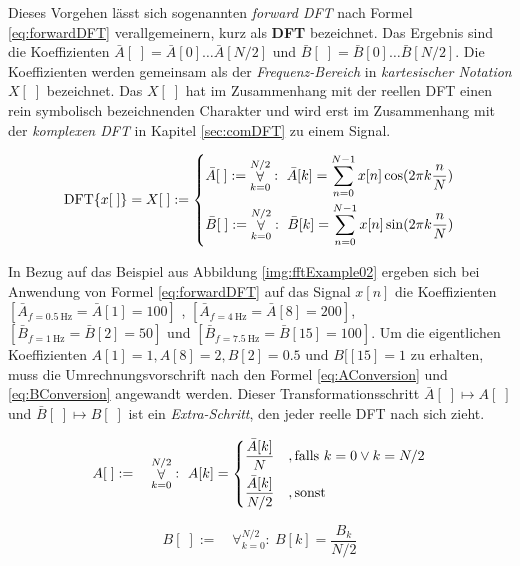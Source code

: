 Dieses Vorgehen lässt sich sogenannten \emph{forward DFT} nach Formel \ref{eq:forwardDFT} verallgemeinern, kurz als \textbf{DFT} bezeichnet. Das Ergebnis sind die Koeffizienten $\bar{A}[\;] = \bar{A}[0]\ldots \bar{A}[N/2]$ und $\bar{B}[\;] = \bar{B}[0] \ldots \bar{B}[N/2]$. Die Koeffizienten werden gemeinsam als der \emph{Frequenz-Bereich} in \emph{kartesischer Notation} $X[\;]$ bezeichnet. Das $X[\;]$ hat im Zusammenhang mit der reellen DFT einen rein symbolisch bezeichnenden Charakter und wird erst im Zusammenhang mit der \emph{komplexen DFT} in Kapitel \ref{sec:comDFT} zu einem Signal.  \cite[S. 158]{dspGuide}

\begin{equation}
\text{DFT}\{x[\;]\} = X[\;] :=
\begin{dcases}
\bar{A}[\;]  := \mathop{\forall}_{k = 0}^{N/2} :\ \bar{A}[k] = \sum_{n=0}^{N-1}x[n] \cos(2\pi k \frac{n}{N}) \\
 \bar{B}[\;] := \mathop{\forall}_{k = 0}^{N/2} :\ \bar{B}[k] = \sum_{n=0}^{N-1}x[n] \sin(2\pi k \frac{n}{N}) 
\end{dcases}
\label{eq:forwardDFT}
\end{equation}

In Bezug auf das Beispiel aus Abbildung \ref{img:fftExample02} ergeben sich bei Anwendung von Formel \ref{eq:forwardDFT} auf das Signal $x[n]$ die Koeffizienten $[ \bar{A}_{f=\SI{0.5}{\hertz}} = \bar{A}[1] = 100 ]$ , $[  \bar{A}_{f=\SI{4}{\hertz}} = \bar{A}[8] = 200 ]$, $[ \bar{B}_{f=\SI{1}{\hertz}} = \bar{B}[2] = 50 ]$ und $[ \bar{B}_{f=\SI{7.5}{\hertz}} = \bar{B}[15] = 100 ]$. Um die eigentlichen Koeffizienten $A[1] = 1, A[8] = 2, B[2] = 0.5$ und $B[[15] = 1$ zu erhalten, muss die Umrechnungsvorschrift nach den Formel \ref{eq:AConversion} und \ref{eq:BConversion} angewandt werden. Dieser Transformationsschritt $\bar{A}[\;] \longmapsto  A[\;]$ und $\bar{B}[\;] \longmapsto  B[\;]$ ist ein \emph{Extra-Schritt}, den jeder reelle DFT nach sich zieht. \cite[S. 152 - 153]{dspGuide}

\begin{equation}
A[\;] := \quad \mathop{\forall}_{k = 0}^{N/2} :\ A[k] = 
\begin{dcases}
\frac{\bar{A}[k]}{N} \quad, \text{falls } k = 0 \vee k = N/2\\
\frac{\bar{A}[k]}{N/2} \quad ,\text{sonst} \\
\end{dcases}
\label{eq:AConversion}
\end{equation}

\begin{equation}
B[\;] := \quad \mathop{\forall}_{k = 0}^{N/2} :\
B[k]= \frac{B_k}{N/2}
\label{eq:BConversion}
\end{equation}

